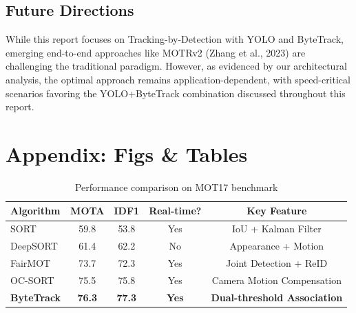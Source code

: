 \documentclass[11pt]{article}
\begin{document}
\subsection{Future Directions}
While this report focuses on Tracking-by-Detection with YOLO and ByteTrack, emerging end-to-end approaches like MOTRv2 (Zhang et al., 2023) are challenging the traditional paradigm. However, as evidenced by our architectural analysis, the optimal approach remains application-dependent, with speed-critical scenarios favoring the YOLO+ByteTrack combination discussed throughout this report.

\newpage
\section{Appendix: Figs \& Tables}
\begin{table}[h]
    \centering
    \begin{tabular}{|l|c|c|c|c|}
        \hline
        \textbf{Algorithm} & \textbf{MOTA} & \textbf{IDF1} & \textbf{Real-time?} & \textbf{Key Feature} \\
        \hline
        SORT & 59.8 & 53.8 & Yes & IoU + Kalman Filter \\
        DeepSORT & 61.4 & 62.2 & No & Appearance + Motion \\
        FairMOT & 73.7 & 72.3 & Yes & Joint Detection + ReID \\
        OC-SORT & 75.5 & 75.8 & Yes & Camera Motion Compensation \\
        \textbf{ByteTrack} & \textbf{76.3} & \textbf{77.3} & \textbf{Yes} & \textbf{Dual-threshold Association} \\
        \hline
    \end{tabular}
    \label{tab:mot17_results}
    \caption{Performance comparison on MOT17 benchmark}
\end{table}
\end{document}
